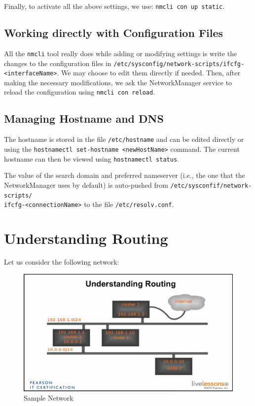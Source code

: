 \noindent
Finally, to activate all the above settings, we use: \verb|nmcli con up static|.

\subsection{Working directly with Configuration Files}
All the \verb|nmcli| tool really does while adding or modifying settings is write the changes to the configuration files in \verb|/etc/sysconfig/network-scripts/ifcfg-<interfaceName>|. We may choose to edit them directly if needed. Then, after making the necessary modifications, we ask the NetworkManager service to reload the configuration using \verb|nmcli con reload|.

\subsection{Managing Hostname and DNS}
The hostname is stored in the file \verb|/etc/hostname| and can be edited directly or using the \verb|hostnamectl set-hostname <newHostName>| command. The current hostname can then be viewed using \verb|hostnamectl status|.

The value of the search domain and preferred nameserver (i.e., the one that the NetworkManager uses by default) is auto-pushed from \verb|/etc/sysconfif/network-scripts/|\\\verb|ifcfg-<connectionName>| to the file \verb|/etc/resolv.conf|. 

\section{Understanding Routing}
Let us consider the following network:

\begin{figure}[H]
	\centering
	\includegraphics[width=0.9\linewidth]{Mod2/chapters/2.6.a}
	\caption{Sample Network}
	\label{fig:2}
\end{figure}

